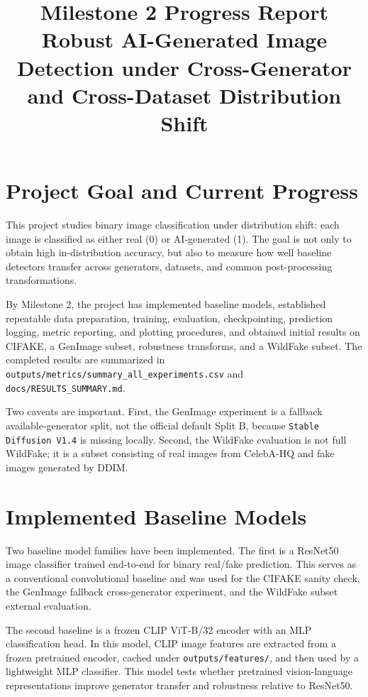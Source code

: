 \documentclass[11pt]{article}
\title{Milestone 2 Progress Report\\Robust AI-Generated Image Detection under Cross-Generator and Cross-Dataset Distribution Shift}
\author{}
\date{}
\begin{document}
\maketitle

\section{Project Goal and Current Progress}

This project studies binary image classification under distribution shift: each image is classified as either real (0) or AI-generated (1). The goal is not only to obtain high in-distribution accuracy, but also to measure how well baseline detectors transfer across generators, datasets, and common post-processing transformations.

By Milestone 2, the project has implemented baseline models, established repeatable data preparation, training, evaluation, checkpointing, prediction logging, metric reporting, and plotting procedures, and obtained initial results on CIFAKE, a GenImage subset, robustness transforms, and a WildFake subset. The completed results are summarized in \texttt{outputs/metrics/summary\_all\_experiments.csv} and \texttt{docs/RESULTS\_SUMMARY.md}.

Two caveats are important. First, the GenImage experiment is a fallback available-generator split, not the official default Split B, because \texttt{Stable Diffusion V1.4} is missing locally. Second, the WildFake evaluation is not full WildFake; it is a subset consisting of real images from CelebA-HQ and fake images generated by DDIM.

\section{Implemented Baseline Models}

Two baseline model families have been implemented. The first is a ResNet50 image classifier trained end-to-end for binary real/fake prediction. This serves as a conventional convolutional baseline and was used for the CIFAKE sanity check, the GenImage fallback cross-generator experiment, and the WildFake subset external evaluation.

The second baseline is a frozen CLIP ViT-B/32 encoder with an MLP classification head. In this model, CLIP image features are extracted from a frozen pretrained encoder, cached under \texttt{outputs/features/}, and then used by a lightweight MLP classifier. This model tests whether pretrained vision-language representations improve generator transfer and robustness relative to ResNet50.
\end{document}
